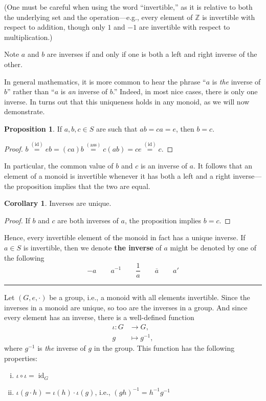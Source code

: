 \documentclass[12pt]{article}
\newcommand{\keyword}[1]{\textbf{#1}}
\newcommand{\sepline}{\rule{\textwidth}{0.4pt}}
\theoremstyle{definition}
\newtheorem{corollary}{Corollary}
\newtheorem{proposition}{Proposition}
\newcommand{\Z}{\mathbb{Z}}
\newcommand{\<}{\left\langle}
\renewcommand{\>}{\right\rangle}
\newcommand{\To}{\longrightarrow}
\newcommand{\Mapsto}{\longmapsto}
\newcommand{\eqby}[1]{\overset{\mathrm{(#1)}}{=}}
\DeclareMathOperator{\id}{id}
\begin{document}
(One must be careful when using the word ``invertible,'' as it is relative to both the underlying set and the operation---e.g., every element of $\Z$ is invertible with respect to addition, though only $1$ and $-1$ are invertible with respect to multiplication.)

Note $a$ and $b$ are inverses if and only if one is both a left and right inverse of the other.

In general mathematics, it is more common to hear the phrase ``$a$ is \textit{the} inverse of $b$'' rather than ``$a$ is \textit{an} inverse of $b$.''
Indeed, in most nice cases, there is only one inverse.
In turns out that this uniqueness holds in any monoid, as we will now demonstrate.

\begin{proposition}
    If $a, b, c \in S$ are such that $ab = ca = e$, then $b = c$.
\end{proposition}

\begin{proof}
    $b \eqby{id} eb = (ca)b \eqby{ass} c(ab) = ce \eqby{id} c$.
\end{proof}

In particular, the common value of $b$ and $c$ is an inverse of $a$.
It follows that an element of a monoid is invertible whenever it has both a left and a right inverse---the proposition implies that the two are equal.

\begin{corollary}
    Inverses are unique.
\end{corollary}

\begin{proof}
    If $b$ and $c$ are both inverses of $a$, the proposition implies $b = c$.
\end{proof}

Hence, every invertible element of the monoid in fact has a unique inverse.
If $a \in S$ is invertible, then we denote \keyword{the inverse} of $a$ might be denoted by one of the following
\[
    -a \qquad a^{-1} \qquad \frac{1}{a} \qquad \overline{a} \qquad a'
\]

\sepline

Let $(G, e, \cdot)$ be a group, i.e., a monoid with all elements invertible.
Since the inverses in a monoid are unique, so too are the inverses in a group.
And since every element has an inverse, there is a well-defined function 
\begin{align*}
    \iota : G &\To G, \\
        g &\Mapsto g^{-1},
\end{align*}
where $g^{-1}$ is \textit{the} inverse of $g$ in the group.
This function has the following properties:
\begin{enumerate}[(i)]
    \item $\iota \circ \iota = \id_G$
    \item $\iota(g \cdot h) = \iota(h) \cdot \iota(g)$, i.e., $(gh)^{-1} = h^{-1}g^{-1}$
\end{enumerate}
\end{document}
